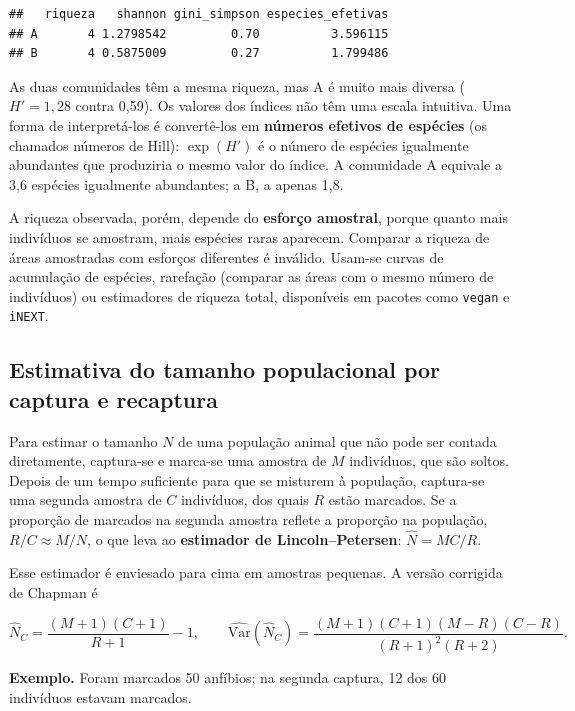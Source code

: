 \documentclass[
]{book}
\begin{document}
\begin{verbatim}
##   riqueza   shannon gini_simpson especies_efetivas
## A       4 1.2798542         0.70          3.596115
## B       4 0.5875009         0.27          1.799486
\end{verbatim}

As duas comunidades têm a mesma riqueza, mas A é muito mais diversa (\(H' = 1{,}28\) contra 0,59). Os valores dos índices não têm uma escala intuitiva. Uma forma de interpretá-los é convertê-los em \textbf{números efetivos de espécies} (os chamados números de Hill): \(\exp(H')\) é o número de espécies igualmente abundantes que produziria o mesmo valor do índice. A comunidade A equivale a 3,6 espécies igualmente abundantes; a B, a apenas 1,8.

A riqueza observada, porém, depende do \textbf{esforço amostral}, porque quanto mais indivíduos se amostram, mais espécies raras aparecem. Comparar a riqueza de áreas amostradas com esforços diferentes é inválido. Usam-se curvas de acumulação de espécies, rarefação (comparar as áreas com o mesmo número de indivíduos) ou estimadores de riqueza total, disponíveis em pacotes como \texttt{vegan} e \texttt{iNEXT}.

\subsection{Estimativa do tamanho populacional por captura e recaptura}\label{estimativa-do-tamanho-populacional-por-captura-e-recaptura}

Para estimar o tamanho \(N\) de uma população animal que não pode ser contada diretamente, captura-se e marca-se uma amostra de \(M\) indivíduos, que são soltos. Depois de um tempo suficiente para que se misturem à população, captura-se uma segunda amostra de \(C\) indivíduos, dos quais \(R\) estão marcados. Se a proporção de marcados na segunda amostra reflete a proporção na população, \(R/C \approx M/N\), o que leva ao \textbf{estimador de Lincoln--Petersen}: \(\hat{N} = MC/R\).

Esse estimador é enviesado para cima em amostras pequenas. A versão corrigida de Chapman é

\[
\hat{N}_C = \frac{(M + 1)(C + 1)}{R + 1} - 1, \qquad
\widehat{\text{Var}}(\hat{N}_C) = \frac{(M+1)(C+1)(M-R)(C-R)}{(R+1)^2(R+2)} .
\]

\textbf{Exemplo.} Foram marcados 50 anfíbios; na segunda captura, 12 dos 60 indivíduos estavam marcados.
\end{document}
